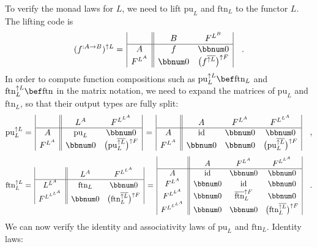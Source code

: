 To verify the monad laws for $L$, we need to lift $\text{pu}_{L}$
and $\text{ftn}_{L}$ to the functor $L$. The lifting code is
\[
(f^{:A\rightarrow B})^{\uparrow L}=\,\begin{array}{|c||cc|}
 & B & F^{L^{B}}\\
\hline A & f & \bbnum 0\\
F^{L^{A}} & \bbnum 0 & \big(f^{\overline{\uparrow L}}\big)^{\uparrow F}
\end{array}\quad.
\]
In order to compute function compositions such as $\text{pu}_{L}^{\uparrow L}\bef\text{ftn}_{L}$
and $\text{ftn}_{L}^{\uparrow L}\bef\text{ftn}$ in the matrix notation,
we need to expand the matrices of $\text{pu}_{L}$ and $\text{ftn}_{L}$,
so that their output types are fully split:
\[
\text{pu}_{L}^{\uparrow L}=\,\begin{array}{|c||cc|}
 & L^{A} & F^{L^{L^{A}}}\\
\hline A & \text{pu}_{L} & \bbnum 0\\
F^{L^{A}} & \bbnum 0 & \big(\text{pu}_{L}^{\overline{\uparrow L}}\big)^{\uparrow F}
\end{array}\,=\,\begin{array}{|c||ccc|}
 & A & F^{L^{A}} & F^{L^{L^{A}}}\\
\hline A & \text{id} & \bbnum 0 & \bbnum 0\\
F^{L^{A}} & \bbnum 0 & \bbnum 0 & \big(\text{pu}_{L}^{\overline{\uparrow L}}\big)^{\uparrow F}
\end{array}\quad,
\]
\[
\text{ftn}_{L}^{\uparrow L}=\,\begin{array}{|c||cc|}
 & L^{A} & F^{L^{L^{A}}}\\
\hline L^{L^{A}} & \text{ftn}_{L} & \bbnum 0\\
F^{L^{L^{L^{A}}}} & \bbnum 0 & \big(\text{ftn}_{L}^{\overline{\uparrow L}}\big)^{\uparrow F}
\end{array}\,=\,\begin{array}{|c||ccc|}
 & A & F^{L^{A}} & F^{L^{L^{A}}}\\
\hline A & \text{id} & \bbnum 0 & \bbnum 0\\
F^{L^{A}} & \bbnum 0 & \text{id} & \bbnum 0\\
F^{L^{L^{A}}} & \bbnum 0 & \overline{\text{ftn}}_{L}^{\uparrow F} & \bbnum 0\\
F^{L^{L^{L^{A}}}} & \bbnum 0 & \bbnum 0 & \big(\text{ftn}_{L}^{\overline{\uparrow L}}\big)^{\uparrow F}
\end{array}\quad.
\]
We can now verify the identity and associativity laws of $\text{pu}_{L}$
and $\text{ftn}_{L}$. Identity laws:
